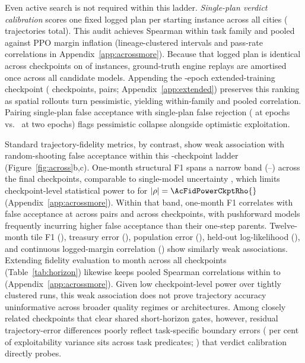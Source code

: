 Even active search is not required within this ladder. \emph{Single-plan verdict calibration} scores one fixed logged plan per starting instance across all \AllCities{} cities (\AllInstances{} trajectories total). This audit achieves Spearman \AcEOneWithin{} \ci{\AcEOneWithinCI} within task family and \AcEOneRho{} \ci{\AcEOneRhoCI} pooled against PPO margin inflation (lineage-clustered intervals and pass-rate correlations in Appendix~\ref{app:acrossmore}). \AcECompWords{} Because that logged plan is identical across checkpoints on \AcBOneSameN{} of \AcBOneN{} instances, ground-truth engine replays are amortised once across all candidate models. Appending the \ExtTrEpochs-epoch extended-training checkpoint (\ExtTrOosCkpts{} checkpoints, \ExtTrOosPairs{} pairs; Appendix~\ref{app:extended}) preserves this ranking as spatial rollouts turn pessimistic, yielding \ExtTrOosBOneWithin{} \ci{\ExtTrOosBOneWithinCI} within-family and \ExtTrOosBOneRho{} \ci{\ExtTrOosBOneRhoCI} pooled correlation. Pairing single-plan false acceptance with single-plan false rejection (\ExtTrRandOneAllFalseRej{} at \ExtTrEpochs{} epochs vs.\ \ExtTrMainRandOneAllFalseRej{} at two epochs) flags pessimistic collapse alongside optimistic exploitation.

Standard trajectory-fidelity metrics, by contrast, show weak association with  random-shooting false acceptance within this \AcClusters-checkpoint ladder (Figure~\ref{fig:across}b,c). One-month structural F1 spans a narrow band (\LadFOneMin{}--\LadFOneMax{}) across the \LadFinals{} final checkpoints, comparable to single-model uncertainty \ci{\TestMainFOneCI}, which limits checkpoint-level statistical power to \AcFidPowerCkpt{} for $|\rho| = \AcFidPowerCkptRho{}$ (Appendix~\ref{app:acrossmore}). Within that band, one-month F1 correlates with  false acceptance at \AcFidFOneRho{} \ci{\AcFidFOneRhoCI} across \AcFidPairs{} pairs and \AcFidFOneCkptRho{} \ci{\AcFidFOneCkptRhoCI} across checkpoints, with pushforward models frequently incurring higher false acceptance than their one-step parents. Twelve-month tile F1 (\AcFidFTwelveRho{}), treasury error (\AcFidFundsRho{}), population error (\AcFidPopRho{}), held-out log-likelihood (\AcFidLikRho{}), and continuous logged-margin correlation (\AcFidDecRho{}) show similarly weak associations. Extending fidelity evaluation to month \Horizon{} across all \AcHorAllCkpts{} checkpoints (Table~\ref{tab:horizon}) likewise keeps pooled Spearman correlations within \AcHorRhoMin{} to \AcHorRhoMax{} (Appendix~\ref{app:acrossmore}). Given low checkpoint-level power over tightly clustered runs, this weak association does not prove trajectory accuracy uninformative across broader quality regimes or architectures. Among closely related checkpoints that clear shared short-horizon gates, however, residual trajectory-error differences poorly reflect task-specific boundary errors (\AcFidShareBetween{} per cent of exploitability variance sits across task predicates; \citealp{lambert2020objective}) that verdict calibration directly probes.
